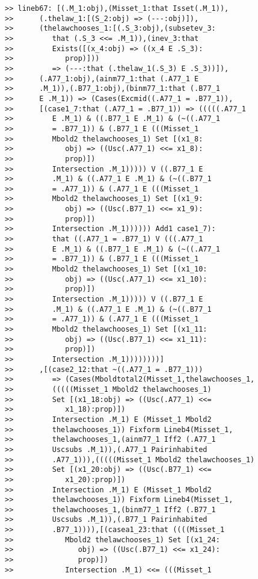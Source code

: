 \documentclass[12pt]{article}
\begin{document}
\begin{verbatim}
>> lineb67: [(.M_1:obj),(Misset_1:that Isset(.M_1)),
>>      (.thelaw_1:[(S_2:obj) => (---:obj)]),
>>      (thelawchooses_1:[(.S_3:obj),(subsetev_3:
>>         that (.S_3 <<= .M_1)),(inev_3:that
>>         Exists([(x_4:obj) => ((x_4 E .S_3):
>>            prop)]))
>>         => (---:that (.thelaw_1(.S_3) E .S_3))]),
>>      (.A77_1:obj),(ainm77_1:that (.A77_1 E
>>      .M_1)),(.B77_1:obj),(binm77_1:that (.B77_1
>>      E .M_1)) => (Cases(Excmid((.A77_1 = .B77_1)),
>>      [(case1_7:that (.A77_1 = .B77_1)) => (((((.A77_1
>>         E .M_1) & ((.B77_1 E .M_1) & (~((.A77_1
>>         = .B77_1)) & (.B77_1 E (((Misset_1
>>         Mbold2 thelawchooses_1) Set [(x1_8:
>>            obj) => ((Usc(.A77_1) <<= x1_8):
>>            prop)])
>>         Intersection .M_1))))) V ((.B77_1 E
>>         .M_1) & ((.A77_1 E .M_1) & (~((.B77_1
>>         = .A77_1)) & (.A77_1 E (((Misset_1
>>         Mbold2 thelawchooses_1) Set [(x1_9:
>>            obj) => ((Usc(.B77_1) <<= x1_9):
>>            prop)])
>>         Intersection .M_1)))))) Add1 case1_7):
>>         that ((.A77_1 = .B77_1) V (((.A77_1
>>         E .M_1) & ((.B77_1 E .M_1) & (~((.A77_1
>>         = .B77_1)) & (.B77_1 E (((Misset_1
>>         Mbold2 thelawchooses_1) Set [(x1_10:
>>            obj) => ((Usc(.A77_1) <<= x1_10):
>>            prop)])
>>         Intersection .M_1))))) V ((.B77_1 E
>>         .M_1) & ((.A77_1 E .M_1) & (~((.B77_1
>>         = .A77_1)) & (.A77_1 E (((Misset_1
>>         Mbold2 thelawchooses_1) Set [(x1_11:
>>            obj) => ((Usc(.B77_1) <<= x1_11):
>>            prop)])
>>         Intersection .M_1))))))))]
>>      ,[(case2_12:that ~((.A77_1 = .B77_1)))
>>         => (Cases(Mboldtotal2(Misset_1,thelawchooses_1,
>>         (((((Misset_1 Mbold2 thelawchooses_1)
>>         Set [(x1_18:obj) => ((Usc(.A77_1) <<=
>>            x1_18):prop)])
>>         Intersection .M_1) E (Misset_1 Mbold2
>>         thelawchooses_1)) Fixform Lineb4(Misset_1,
>>         thelawchooses_1,(ainm77_1 Iff2 (.A77_1
>>         Uscsubs .M_1)),(.A77_1 Pairinhabited
>>         .A77_1))),(((((Misset_1 Mbold2 thelawchooses_1)
>>         Set [(x1_20:obj) => ((Usc(.B77_1) <<=
>>            x1_20):prop)])
>>         Intersection .M_1) E (Misset_1 Mbold2
>>         thelawchooses_1)) Fixform Lineb4(Misset_1,
>>         thelawchooses_1,(binm77_1 Iff2 (.B77_1
>>         Uscsubs .M_1)),(.B77_1 Pairinhabited
>>         .B77_1)))),[(casea1_23:that ((((Misset_1
>>            Mbold2 thelawchooses_1) Set [(x1_24:
>>               obj) => ((Usc(.B77_1) <<= x1_24):
>>               prop)])
>>            Intersection .M_1) <<= (((Misset_1

\end{verbatim}
\end{document}
